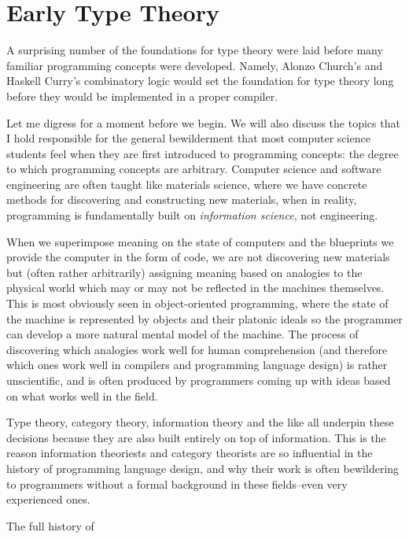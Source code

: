 \section{Early Type Theory}
\label{sec:early-type-theory}

A surprising number of the foundations for type theory were laid before
many familiar programming concepts were developed.
Namely, Alonzo Church's \lambdacalc{} and Haskell Curry's combinatory logic
would set the foundation for type theory long before they would be implemented in
a proper compiler.

Let me digress for a moment before we begin.
We will also discuss the topics that I hold responsible for the general
bewilderment that most computer science students feel when they are first
introduced to programming concepts: the degree to which programming concepts
are arbitrary.
Computer science and software engineering are often taught like materials science,
where we have concrete methods for discovering and constructing new materials,
when in reality, programming is fundamentally built on \textit{information science},
not engineering.

When we superimpose meaning on the state of computers and the blueprints
we provide the computer in the form of code, we are not discovering new materials
but (often rather arbitrarily) assigning meaning based on analogies to the physical
world which may or may not be reflected in the machines themselves.
This is most obviously seen in object-oriented programming, where the state of
the machine is represented by objects and their platonic ideals so the programmer
can develop a more natural mental model of the machine.
The process of discovering which analogies work well for human comprehension
(and therefore which ones work well in compilers and programming language design)
is rather unscientific, and is often produced by programmers coming up with
ideas based on what works well in the field.

Type theory, category theory, information theory and the like all underpin
these decisions because they are also built entirely on top of information.
This is the reason information theoriests and category theorists are so
influential in the history of programming language design, and why their
work is often bewildering to programmers without a formal background
in these fields--even very experienced ones.

The full history of


